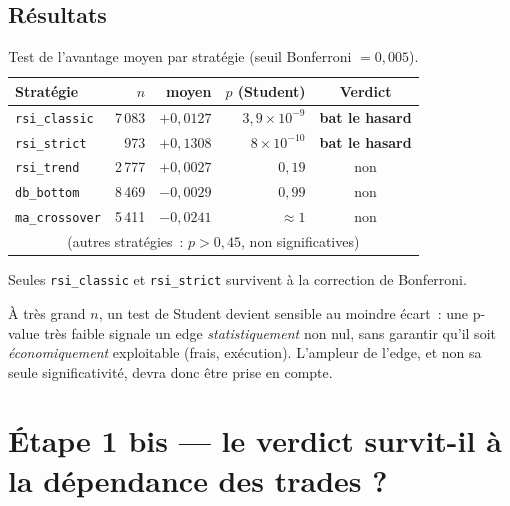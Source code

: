 \subsection{Résultats}
\begin{table}[H]
\centering
\caption{Test de l'avantage moyen par stratégie (seuil Bonferroni $=0{,}005$).}
\label{tab:b1-etape1}
\small
\begin{tabular}{@{}lrrrc@{}}
\toprule
Stratégie & $n$ & \edgevar{} moyen & $p$ (Student) & Verdict \\
\midrule
\texttt{rsi\_classic} & 7\,083 & $+0{,}0127$ & $3{,}9\times10^{-9}$  & \textbf{bat le hasard} \\
\texttt{rsi\_strict}  &   973  & $+0{,}1308$ & $8\times10^{-10}$     & \textbf{bat le hasard} \\
\texttt{rsi\_trend}   & 2\,777 & $+0{,}0027$ & $0{,}19$             & non \\
\texttt{db\_bottom}   & 8\,469 & $-0{,}0029$ & $0{,}99$             & non \\
\texttt{ma\_crossover}& 5\,411 & $-0{,}0241$ & $\approx 1$          & non \\
\multicolumn{5}{c}{\footnotesize (autres stratégies~: $p>0{,}45$, non significatives)} \\
\bottomrule
\end{tabular}
\end{table}

Seules \texttt{rsi\_classic} et \texttt{rsi\_strict} survivent à la
correction de Bonferroni.

\begin{limites}
À très grand $n$, un test de Student devient sensible au moindre écart~:
une p-value très faible signale un edge \emph{statistiquement} non nul,
sans garantir qu'il soit \emph{économiquement} exploitable (frais,
exécution). L'ampleur de l'edge, et non sa seule significativité, devra
donc être prise en compte.
\end{limites}

\section{Étape 1 bis --- le verdict survit-il à la dépendance des trades ?}
\label{sec:b1-dependance}

